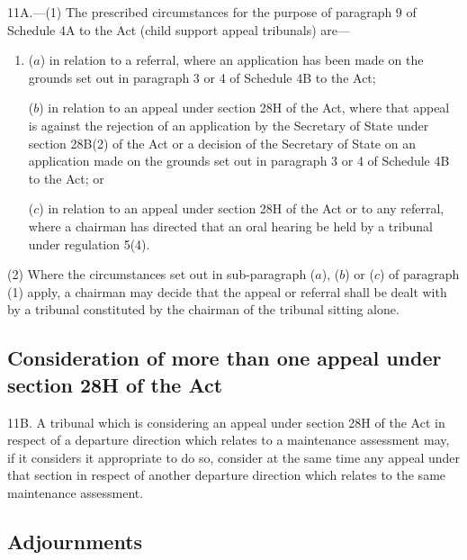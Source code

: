 \documentclass[12pt,a4paper]{article}
\begin{document}
11A.—(1) The prescribed circumstances for the purpose of paragraph 9 of Schedule 4A to the Act (child support appeal tribunals) are—
\begin{enumerate}\item[]
($a$) in relation to a referral, where an application has been made on the grounds set out in paragraph 3 or 4 of Schedule 4B to the Act;

($b$) in relation to an appeal under section 28H of the Act, where that appeal is against the rejection of an application by the Secretary of State under section 28B(2) of the Act or a decision of the Secretary of State on an application made on the grounds set out in paragraph 3 or 4 of Schedule 4B to the Act; or

($c$) in relation to an appeal under section 28H of the Act or to any referral, where a chairman has directed that an oral hearing be held by a tribunal under regulation 5(4).
\end{enumerate}

(2) Where the circumstances set out in sub-paragraph ($a$), ($b$) or ($c$) of paragraph (1) apply, a chairman may decide that the appeal or referral shall be dealt with by a tribunal constituted by the chairman of the tribunal sitting alone.


\subsection[11B. Consideration of more than one appeal under section 28H of the Act]{Consideration of more than one appeal under section 28H of the Act}

11B. A tribunal which is considering an appeal under section 28H of the Act in respect of a departure direction which relates to a maintenance assessment may, if it considers it appropriate to do so, consider at the same time any appeal under that section in respect of another departure direction which relates to the same maintenance assessment.


\subsection[12. Adjournments]{Adjournments}
\end{document}
